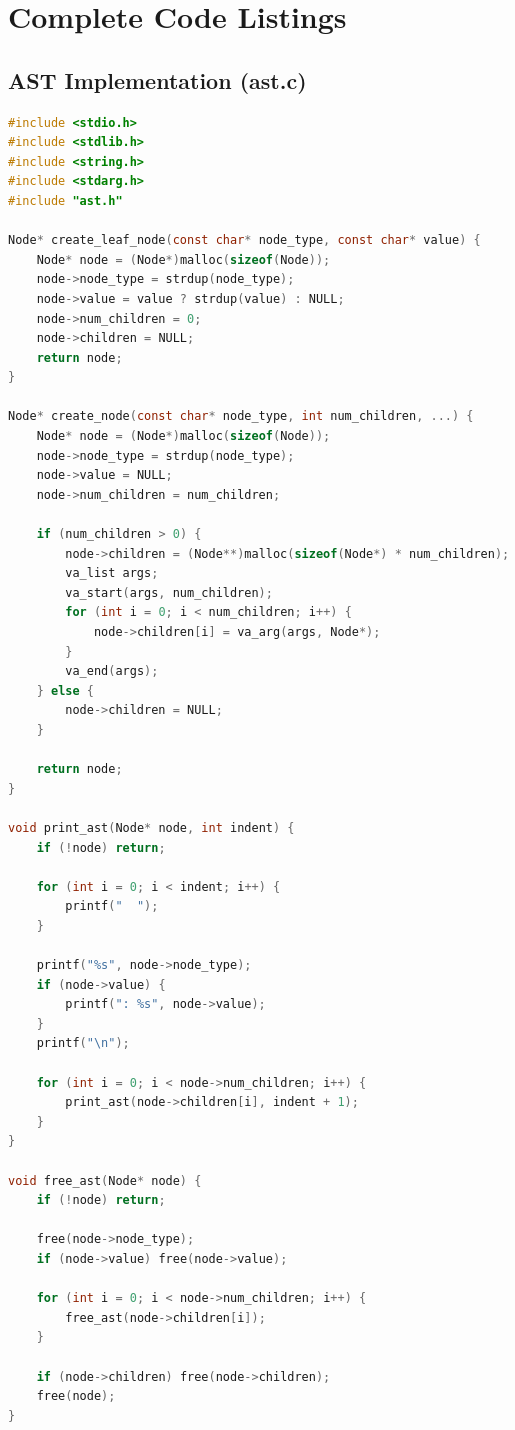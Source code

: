 \documentclass[a4paper,12pt]{report}
\begin{document}
\chapter{Complete Code Listings}
\thispagestyle{contentpages}

\section{AST Implementation (ast.c)}
\begin{lstlisting}[language=C, caption=Complete AST Implementation]
#include <stdio.h>
#include <stdlib.h>
#include <string.h>
#include <stdarg.h>
#include "ast.h"

Node* create_leaf_node(const char* node_type, const char* value) {
    Node* node = (Node*)malloc(sizeof(Node));
    node->node_type = strdup(node_type);
    node->value = value ? strdup(value) : NULL;
    node->num_children = 0;
    node->children = NULL;
    return node;
}

Node* create_node(const char* node_type, int num_children, ...) {
    Node* node = (Node*)malloc(sizeof(Node));
    node->node_type = strdup(node_type);
    node->value = NULL;
    node->num_children = num_children;
    
    if (num_children > 0) {
        node->children = (Node**)malloc(sizeof(Node*) * num_children);
        va_list args;
        va_start(args, num_children);
        for (int i = 0; i < num_children; i++) {
            node->children[i] = va_arg(args, Node*);
        }
        va_end(args);
    } else {
        node->children = NULL;
    }
    
    return node;
}

void print_ast(Node* node, int indent) {
    if (!node) return;
    
    for (int i = 0; i < indent; i++) {
        printf("  ");
    }
    
    printf("%s", node->node_type);
    if (node->value) {
        printf(": %s", node->value);
    }
    printf("\n");
    
    for (int i = 0; i < node->num_children; i++) {
        print_ast(node->children[i], indent + 1);
    }
}

void free_ast(Node* node) {
    if (!node) return;
    
    free(node->node_type);
    if (node->value) free(node->value);
    
    for (int i = 0; i < node->num_children; i++) {
        free_ast(node->children[i]);
    }
    
    if (node->children) free(node->children);
    free(node);
}
\end{lstlisting}
\end{document}
